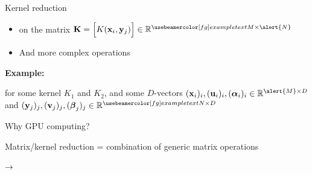 \documentclass[12pt,aspectratio=1610]{beamer}
\begin{document}
\begin{frame}{Kernel reduction}

\bigskip
\begin{itemize}
\setitsep{1.5em}
\item {} on the matrix $\mb K = \Big[K(\mb x_i, \mb y_j)\Big] \in \RR^{\myexample{M}\times\alert{N}}$
\item And more complex operations
\end{itemize}

\bigskip\bigskip

\textbf{Example:} \hfill {} \hfill ~

\bigskip

for some kernel $K_1$ and $K_2$, and some $D$-vectors $(\mb x_i)_i, (\mb u_i)_i, (\mbg\alpha_i)_i \in \RR^{\alert{M}\times D}$ and $(\mb y_j)_j, (\mb v_j)_j, (\mbg\beta_j)_j \in \RR^{\myexample{N}\times D}$

\end{frame}


%
%
%
%
%
%
%
%



\begin{frame}{Why GPU computing?}

Matrix/kernel reduction = combination of generic matrix operations

\bigskip

\begin{center}
$\rightarrow$ 
\end{center}

\end{frame}
\end{document}
